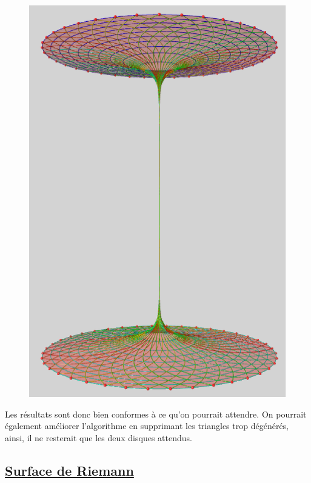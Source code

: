 \documentclass {report}
\begin{document}
\begin{figure}[h!]
\begin{minipage}[b]{0.3\linewidth}
   \end{minipage}\hfill
   \begin{minipage}[b]{0.3\linewidth}   
     \centering \includegraphics[scale=0.206]{Images_Fichiers/9.eps}
     
   \end{minipage}
\end{figure}

Les résultats sont donc bien conformes à ce qu'on pourrait attendre. On pourrait également améliorer l'algorithme en supprimant les triangles trop dégénérés, ainsi, il ne resterait que les deux disques attendus.

\subsection[Surface de Riemann]{\uline{Surface de Riemann}}
\end{document}
